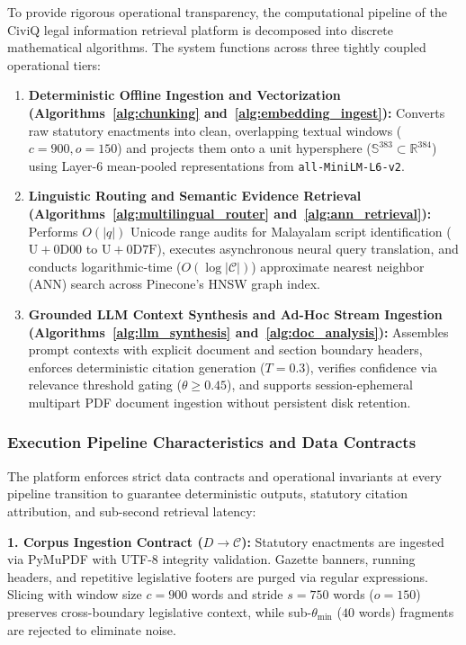 \documentclass[12pt,a4paper]{report}
\begin{document}
To provide rigorous operational transparency, the computational pipeline of the CiviQ legal information retrieval platform is decomposed into discrete mathematical algorithms. The system functions across three tightly coupled operational tiers:
\begin{enumerate}
    \item \textbf{Deterministic Offline Ingestion and Vectorization (Algorithms~\ref{alg:chunking} and~\ref{alg:embedding_ingest}):} Converts raw statutory enactments into clean, overlapping textual windows ($c=900, o=150$) and projects them onto a unit hypersphere ($\mathbb{S}^{383} \subset \mathbb{R}^{384}$) using Layer-6 mean-pooled representations from \texttt{all-MiniLM-L6-v2}.
    \item \textbf{Linguistic Routing and Semantic Evidence Retrieval (Algorithms~\ref{alg:multilingual_router} and~\ref{alg:ann_retrieval}):} Performs $O(|q|)$ Unicode range audits for Malayalam script identification ($\mathrm{U{+}0D00}$ to $\mathrm{U{+}0D7F}$), executes asynchronous neural query translation, and conducts logarithmic-time ($O(\log |\mathcal{C}|)$) approximate nearest neighbor (ANN) search across Pinecone's HNSW graph index.
    \item \textbf{Grounded LLM Context Synthesis and Ad-Hoc Stream Ingestion (Algorithms~\ref{alg:llm_synthesis} and~\ref{alg:doc_analysis}):} Assembles prompt contexts with explicit document and section boundary headers, enforces deterministic citation generation ($T=0.3$), verifies confidence via relevance threshold gating ($\theta \ge 0.45$), and supports session-ephemeral multipart PDF document ingestion without persistent disk retention.
\end{enumerate}

\subsubsection{Execution Pipeline Characteristics and Data Contracts}
The platform enforces strict data contracts and operational invariants at every pipeline transition to guarantee deterministic outputs, statutory citation attribution, and sub-second retrieval latency:

\noindent\textbf{1. Corpus Ingestion Contract ($D \to \mathcal{C}$):} Statutory enactments are ingested via PyMuPDF with UTF-8 integrity validation. Gazette banners, running headers, and repetitive legislative footers are purged via regular expressions. Slicing with window size $c=900$ words and stride $s=750$ words ($o=150$) preserves cross-boundary legislative context, while sub-$\theta_{\min}$ ($40$ words) fragments are rejected to eliminate noise.
\end{document}
